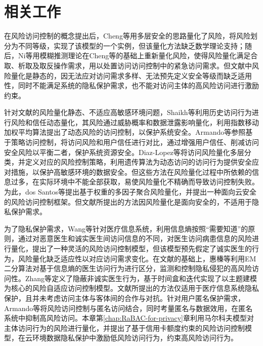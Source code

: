 \section{相关工作}

在风险访问控制\cite{mcgraw2009risk}的概念提出后，Cheng等\cite{cheng2007fuzzy}用多层安全的思路量化了风险，将风险划分为不同等级，实现了该模型的一个实例，但该量化方法缺乏数学理论支持；随后，Ni等\cite{ni2010risk}用模糊推测理论在Cheng等的基础上重新量化风险，使得风险量化满足合取、析取及取反操作需求，用以处置访问访问控制中的紧急访问需求。但文献\cite{cheng2007fuzzy,ni2010risk}中风险量化是静态的，因无法应对访问需求多样、无法预先定义安全等级而缺乏适用性，同时不能满足系统的隐私保护需求，也不能对访问主体的高风险访问进行激励约束。

针对文献\cite{cheng2007fuzzy,ni2010risk}的风险量化静态、不适应高敏感环境问题，Shaikh等\cite{shaikh2012dynamic}利用历史访问行为进行风险和信任动态量化，其风险通过威胁概率和数据泄露影响量化，利用指数移动加权平均算法提出了动态风险的访问控制，以保护系统安全。Armando等\cite{armando2015balancing}参照基于策略访问控制，将访问风险和用户信任进行对比，通过增强用户信任、削减访问安全风险以平衡二者，保护系统资源安全。Diaz-Lopez等\cite{diaz-lopez2016dynamic}将访问风险量化多层分类，并定义对应的风险控制策略，利用遗传算法为动态访问的访问行为提供安全应对措施，以保护高敏感环境的数据安全。但这些方法在风险量化过程中所依赖的信息过多，在实际环境中不能全部获取，易使风险量化不精确而导致访问控制失败。为此，dos Santos等\cite{santos2016framework}提出基于权重的多因子聚合风险量化，并提出一种面向云安全的风险访问控制框架。但文献\cite{shaikh2012dynamic,armando2015balancing,diaz-lopez2016dynamic,santos2016framework}所提出的方法因风险量化是面向安全的，不适用于隐私保护需求。

为了隐私保护需求，Wang等\cite{wang2011quantified}针对医疗信息系统，利用信息熵按照“需要知道”的原则，通过对恶意医生和诚实医生间访问信息的不同，对医生访问病患信息的风险进行量化，提出了一种灵活的风险访问控制模型，但该模型预先假定了诚实医生的行为，风险量化缺乏适应性以对应访问需求变化。在文献\cite{wang2011quantified}的基础上，惠榛等\cite{hui2015risk}利用EM二分算法对基于信息熵的医生访问行为进行区分，监测和控制隐私侵犯的高风险访问性。Zhang等\cite{zhang2018privacy}定义了隐蔽非诚实医生行为，基于时间盒和迭代实现了以主题建模为核心的风险自适应访问控制模型。文献\cite{wang2011quantified,hui2015risk,zhang2018privacy}所提出的方法仅适用于医疗信息系统隐私保护，且并未考虑访问主体与客体间的合作与对抗。针对用户匿名保护需求，Armando等\cite{armando2015risk}将风险访问控制与匿名访问结合，同时考量匿名与数据效用，在匿名系统中抑制高风险访问。本章第\ref{chap:RaBAC-for-privacy}章利用马尔科夫模型对主体访问行为的风险进行量化，并提出了基于信用卡额度约束的风险访问控制模型，在云环境数据隐私保护中激励低风险访问行为，约束高风险访问行为。

